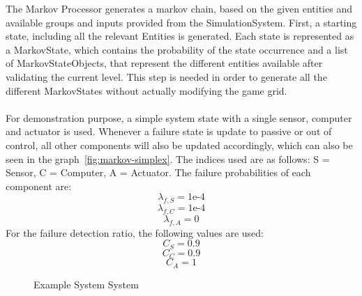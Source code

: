 The Markov Processor generates a markov chain, based on the given entities and available groups and inputs provided from the SimulationSystem.
First, a starting state, including all the relevant Entities is generated.
Each state is represented as a MarkovState, which contains the probability of the state occurrence and a list of MarkovStateObjects, that represent the different entities available after validating
the current level.
This step is needed in order to generate all the different MarkovStates without actually modifying the game grid.
\\ \\
For demonstration purpose, a simple system state with a single sensor, computer and actuator is used.
Whenever a failure state is update to passive or out of control, all other components will also be updated accordingly, which can also be seen in the graph~\ref{fig:markov-simplex}.
The indices used are as follows: S = Sensor, C = Computer, A = Actuator.
The failure probabilities of each component are:
\begin{equation}
    \lambda_{f,S} = 1\text{e-}4
    \label{eq:markov-1}
\end{equation}
\begin{equation}
    \lambda_{f,C} = 1\text{e-}4
    \label{eq:markov-2}
\end{equation}
\begin{equation}
    \lambda_{f,A} = 0
    \label{eq:markov-3}
\end{equation}
For the failure detection ratio, the following values are used:
\begin{equation}
    C_{S} = 0.9
    \label{eq:markov-4}
\end{equation}
\begin{equation}
    C_{C} = 0.9
    \label{eq:markov-5}
\end{equation}
\begin{equation}
    C_{A} = 1
    \label{eq:markov-6}
\end{equation}

\begin{figure}
    \begin{center}
    \end{center}\caption{Example System System}
    \label{fig:simplex}
\end{figure}


